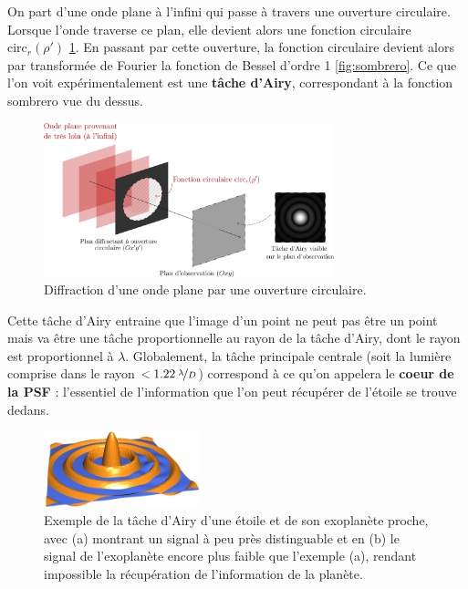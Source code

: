 On part d'une onde plane à l'infini qui passe à travers une ouverture circulaire. Lorsque l'onde traverse ce plan, elle devient alors une fonction circulaire $\text{circ}_r(\rho')$ \ref{fig:diff_expl}.
En passant par cette ouverture, la fonction circulaire devient alors par transformée de Fourier la fonction de Bessel d'ordre 1 \ref{fig:sombrero}. Ce que l'on voit expérimentalement est une \textbf{tâche d'Airy}, correspondant à la fonction sombrero vue du dessus.

\begin{figure}[htbp]
    \centering
    \includegraphics[width=0.75\textwidth]{figures/diff_expl.png}
    \caption{Diffraction d'une onde plane par une ouverture circulaire.}
    \label{fig:diff_expl}
\end{figure}




Cette tâche d'Airy entraine que l’image d’un point ne peut pas être un point mais
va être une tâche proportionnelle au rayon de la tâche d’Airy, dont le rayon est proportionnel à $\lambda$.
Globalement, la tâche principale centrale (soit la lumière comprise dans le rayon $< 1.22\: \nicefrac{\lambda}{D}$) correspond à ce qu'on appelera le \textbf{coeur de la PSF} : l'essentiel de l'information que l'on peut récupérer de l'étoile se trouve dedans.

\begin{figure}
    \centering
    \includegraphics[width=0.4\textwidth]{figures/test_st_pl.jpg}
    \caption{Exemple de la tâche d'Airy d'une étoile et de son exoplanète proche, avec (a) montrant un signal à peu près distinguable et en (b) le signal de l'exoplanète encore plus faible que l'exemple (a), rendant impossible la récupération de l'information de la planète.}
\end{figure}

